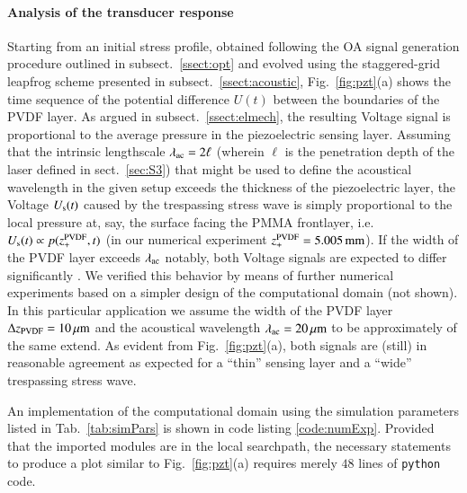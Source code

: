 \documentclass[5p,times,twocolumn]{elsarticle}
\begin{document}
\paragraph{Analysis of the transducer response}
Starting from an initial stress profile, obtained following the OA signal
generation procedure outlined in subsect.\ \ref{ssect:opt} and evolved using the
staggered-grid leapfrog scheme presented in subsect.\ \ref{ssect:acoustic},
Fig.\ \ref{fig:pzt}(a) shows the time sequence of the potential difference
$U(t)$ between the boundaries of the PVDF layer.  As argued in subsect.\
\ref{ssect:elmech}, the resulting Voltage signal is proportional to the average
pressure in the piezoelectric sensing layer.  Assuming that the intrinsic
lengthscale $\lambda_{\rm{ac}} = 2 \ell$ (wherein $\ell$ is the penetration
depth of the laser defined in sect.\ \ref{sec:S3}) that might be used to define
the acoustical wavelength in the given setup exceeds the thickness of the
piezoelectric layer, the Voltage $U_{\rm{s}}(t)$ caused by the
trespassing stress wave is simply proportional to the local pressure at, say,
the surface facing the PMMA frontlayer, i.e.\ $U_{\rm{s}}(t)\propto
p(z^{\rm{PVDF}}_{+},t)$ \cite{Schoeffmann:1988,Jaeger:2005} (in our numerical
experiment $z^{\rm{PVDF}}_{+}=5.005\,{\rm{mm}}$). If the width of the PVDF
layer exceeds $\lambda_{\rm{ac}}$ notably, both Voltage signals are expected to
differ significantly \cite{Schoeffmann:1988}. We verified this behavior by
means of further numerical experiments based on a simpler design of the
computational domain (not shown).  In this particular application we assume the
width of the PVDF layer $\Delta z_{\rm{PVDF}}=10\,{\rm{\mu m}}$ and the
acoustical wavelength $\lambda_{\rm{ac}}=20\,{\rm{\mu m}}$ to be approximately
of the same extend. As evident from Fig.\ \ref{fig:pzt}(a), both signals are
(still) in reasonable agreement as expected for a ``thin'' sensing layer and a
``wide'' trespassing stress wave.

An implementation of the computational domain using the simulation parameters
listed in Tab.\ \ref{tab:simPars} is shown in code listing \ref{code:numExp}.
Provided that the imported modules are in the local searchpath, the necessary
statements to produce a plot similar to Fig.\ \ref{fig:pzt}(a) requires merely
$48$ lines of {\tt{python}} code.
\end{document}
